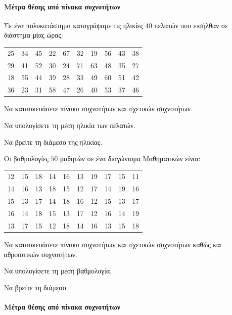 \documentclass[11pt,a4paper,modern]{FFExercises}
\begin{document}
\paragraph{Μέτρα θέσης από πίνακα συχνοτήτων}
\askhsh
\askhsh
Σε ένα πολυκατάστημα καταγράψαμε τις ηλικίες $40$ πελατών που εισήλθαν σε διάστημα μίας ώρας:
\begin{center}
\begin{tabular}{cccccccccc}
25 & 34 & 45 & 22 & 67 & 32 & 19 & 56 & 43 & 38 \\
29 & 41 & 52 & 30 & 24 & 71 & 63 & 48 & 35 & 27 \\
18 & 55 & 44 & 39 & 28 & 33 & 49 & 60 & 51 & 42 \\
36 & 23 & 31 & 58 & 47 & 26 & 40 & 53 & 37 & 46
\end{tabular}
\end{center}
\begin{alist}
    \item Να κατασκευάσετε πίνακα συχνοτήτων και σχετικών συχνοτήτων.
    \item Να υπολογίσετε τη μέση ηλικία των πελατών.
    \item Να βρείτε τη διάμεσο της ηλικίας.
\end{alist}

\askhsh
Οι βαθμολογίες $50$ μαθητών σε ένα διαγώνισμα Μαθηματικών είναι:
\begin{center}
\begin{tabular}{cccccccccc}
12 & 15 & 18 & 14 & 16 & 13 & 19 & 17 & 15 & 11 \\
14 & 16 & 13 & 18 & 15 & 12 & 17 & 14 & 19 & 16 \\
15 & 13 & 17 & 14 & 18 & 16 & 12 & 15 & 13 & 17 \\
16 & 14 & 18 & 15 & 13 & 17 & 12 & 16 & 14 & 19 \\
13 & 17 & 15 & 12 & 18 & 14 & 16 & 13 & 15 & 18
\end{tabular}
\end{center}
\begin{alist}
    \item Να κατασκευάσετε πίνακα συχνοτήτων και σχετικών συχνοτήτων καθώς και αθροιστικών συχνοτήτων. 
    \item Να υπολογίσετε τη μέση βαθμολογία.
    \item Να βρείτε τη διάμεσο.
\end{alist}

\paragraph{Μέτρα θέσης από πίνακα συχνοτήτων}
\end{document}
